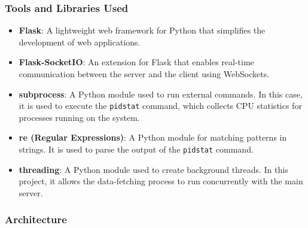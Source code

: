 \documentclass[12pt]{article}
\begin{document}
\subsubsection{Tools and Libraries Used}

\begin{itemize}
    \item \textbf{Flask}: A lightweight web framework for Python that simplifies the development of web applications.
    \item \textbf{Flask-SocketIO}: An extension for Flask that enables real-time communication between the server and the client using WebSockets.
    \item \textbf{subprocess}: A Python module used to run external commands. In this case, it is used to execute the \texttt{pidstat} command, which collects CPU statistics for processes running on the system.
    \item \textbf{re (Regular Expressions)}: A Python module for matching patterns in strings. It is used to parse the output of the \texttt{pidstat} command.
    \item \textbf{threading}: A Python module used to create background threads. In this project, it allows the data-fetching process to run concurrently with the main server.
\end{itemize}

\subsubsection{Architecture}
\end{document}
